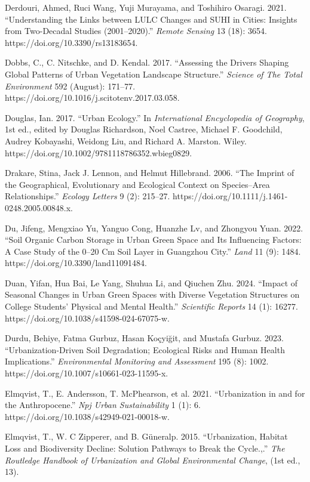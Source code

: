 Derdouri, Ahmed, Ruci Wang, Yuji Murayama, and Toshihiro Osaragi. 2021. ``Understanding the Links between LULC Changes and SUHI in Cities: Insights from Two-Decadal Studies (2001--2020).'' \emph{Remote Sensing} 13 (18): 3654. https://doi.org/10.3390/rs13183654.

Dobbs, C., C. Nitschke, and D. Kendal. 2017. ``Assessing the Drivers Shaping Global Patterns of Urban Vegetation Landscape Structure.'' \emph{Science of The Total Environment} 592 (August): 171--77. https://doi.org/10.1016/j.scitotenv.2017.03.058.

Douglas, Ian. 2017. ``Urban Ecology.'' In \emph{International Encyclopedia of Geography}, 1st ed., edited by Douglas Richardson, Noel Castree, Michael F. Goodchild, Audrey Kobayashi, Weidong Liu, and Richard A. Marston. Wiley. https://doi.org/10.1002/9781118786352.wbieg0829.

Drakare, Stina, Jack J. Lennon, and Helmut Hillebrand. 2006. ``The Imprint of the Geographical, Evolutionary and Ecological Context on Species--Area Relationships.'' \emph{Ecology Letters} 9 (2): 215--27. https://doi.org/10.1111/j.1461-0248.2005.00848.x.

Du, Jifeng, Mengxiao Yu, Yanguo Cong, Huanzhe Lv, and Zhongyou Yuan. 2022. ``Soil Organic Carbon Storage in Urban Green Space and Its Influencing Factors: A Case Study of the 0--20 Cm Soil Layer in Guangzhou City.'' \emph{Land} 11 (9): 1484. https://doi.org/10.3390/land11091484.

Duan, Yifan, Hua Bai, Le Yang, Shuhua Li, and Qiuchen Zhu. 2024. ``Impact of Seasonal Changes in Urban Green Spaces with Diverse Vegetation Structures on College Students' Physical and Mental Health.'' \emph{Scientific Reports} 14 (1): 16277. https://doi.org/10.1038/s41598-024-67075-w.

Durdu, Behiye, Fatma Gurbuz, Hasan Koçyiğit, and Mustafa Gurbuz. 2023. ``Urbanization-Driven Soil Degradation; Ecological Risks and Human Health Implications.'' \emph{Environmental Monitoring and Assessment} 195 (8): 1002. https://doi.org/10.1007/s10661-023-11595-x.

Elmqvist, T., E. Andersson, T. McPhearson, et al. 2021. ``Urbanization in and for the Anthropocene.'' \emph{Npj Urban Sustainability} 1 (1): 6. https://doi.org/10.1038/s42949-021-00018-w.

Elmqvist, T., W. C Zipperer, and B. Güneralp. 2015. ``Urbanization, Habitat Loss and Biodiversity Decline: Solution Pathways to Break the Cycle.,.'' \emph{The Routledge Handbook of Urbanization and Global Environmental Change}, (1st ed., 13).

